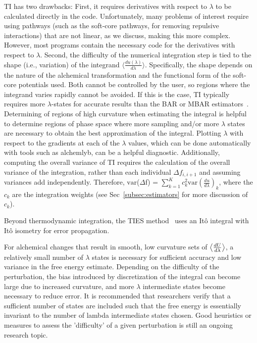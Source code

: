 TI has two drawbacks: First, it requires derivatives with respect to $\lambda$ to be calculated directly in the code. Unfortunately, many problems of interest require using pathways (such as the soft-core pathways, for removing repulsive interactions) that are not linear, as we discuss, making this more complex. However, most programs contain the necessary code for the derivatives with respect to $\lambda$. Second, the difficulty of the numerical integration step is tied to the shape (i.e., variation) of the integrand $\langle\frac{du(\lambda)}{d\lambda}\rangle$. Specifically, the shape depends on the nature of the alchemical transformation and the functional form of the soft-core potentials used. Both cannot be controlled by the user, so regions where the integrand varies rapidly cannot be avoided. If this is the case, TI typically requires more $\lambda$-states for accurate results than the BAR or MBAR estimators~\cite{Bruckner2010}.
Determining of regions of high curvature when estimating the integral is helpful to determine regions of phase space where more sampling and/or more $\lambda$ states are necessary to obtain the best approximation of the integral. Plotting $\lambda$ with respect to the gradients at each of the $\lambda$ values, which can be done automatically with tools such as alchemlyb, can be a helpful diagnostic. 
Additionally, computing the overall variance of TI requires the calculation of the overall variance of the integration, rather than each individual $\Delta f_{i,i+1}$ and assuming variances add independently.
Therefore, $\mathrm{var}$($\Delta$f) = $\sum_{k=1}^{K}c_{k}^2 \mathrm{var}(\frac{du}{d\lambda})_{k}$, where the $c_k$ are the integration weights (see Sec~\ref{subsec:estimators} for more discussion of $c_k$).


Beyond thermodynamic integration, the TIES method~\cite{bhati2017} uses an It\^{o} integral with It\^{o} isometry for error propagation.

For alchemical changes that result in smooth, low curvature sets of $\left\langle{\frac{dU}{d\lambda}}\right\rangle$, a relatively small number of $\lambda$ states is necessary for sufficient accuracy and low variance in the free energy estimate. 
Depending on the difficulty of the perturbation, the bias introduced by discretization of the integral can become large due to increased curvature, and more $\lambda$ intermediate states become necessary to reduce error.
It is recommended that researchers verify that a sufficient number of states are included such that the free energy is essentially invariant to the number of lambda intermediate states chosen. Good heuristics or measures to assess the 'difficulty' of a given perturbation is still an ongoing research topic. 


